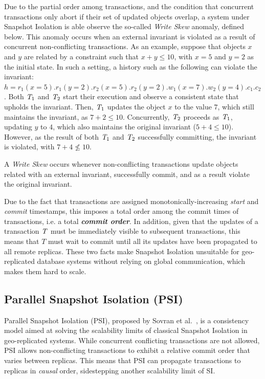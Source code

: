 Due to the partial order among transactions, and the condition that concurrent transactions only abort if their set of updated objects overlap, a system under Snapshot Isolation is able observe the so-called \emph{Write Skew} anomaly, defined below. This anomaly occurs when an external invariant is violated as a result of concurrent non-conflicting transactions. As an example, suppose that objects $x$ and $y$ are related by a constraint such that $x + y \le 10$, with $x = 5$ and $y = 2$ as the initial state. In such a setting, a history such as the following can violate the invariant: $h = r_1(x=5).r_1(y=2).r_2(x=5).r_2(y=2).w_1(x=7).w_2(y=4).c_1.c_2$. Both $\mathit{T}_1$ and $\mathit{T}_2$ start their execution and observe a consistent state that upholds the invariant. Then, $\mathit{T}_1$ updates the object $x$ to the value $7$, which still maintains the invariant, as $7 + 2 \le 10$. Concurrently, $\mathit{T}_2$ proceeds as $\mathit{T}_1$, updating $y$ to $4$, which also maintains the original invariant ($5 + 4 \le 10$). However, as the result of both $\mathit{T}_1$ and $\mathit{T}_2$ successfully committing, the invariant is violated, with $7 + 4 \not\le 10$.

\begin{definition}
A \emph{Write Skew} occurs whenever non-conflicting transactions update objects related with an external invariant, successfully commit, and as a result violate the original invariant.
\end{definition}

Due to the fact that transactions are assigned monotonically-increasing \emph{start} and \emph{commit} timestamps, this imposes a total order among the commit times of transactions, i.e. a total \textbf{\em commit order}. In addition, given that the updates of a transaction $\mathit{T}$ must be immediately visible to subsequent transactions, this means that $T$ must wait to commit until all its updates have been propagated to all remote replicas. These two facts make Snapshot Isolation unsuitable for geo-replicated database systems without relying on global communication, which makes them hard to scale.

\subsection{Parallel Snapshot Isolation (PSI)}
\label{sect:psi}

Parallel Snapshot Isolation (PSI), proposed by Sovran et al.~\citep{psi-intro}, is a consistency model aimed at solving the scalability limits of classical Snapshot Isolation in geo-replicated systems. While concurrent conflicting transactions are not allowed, PSI allows non-conflicting transactions to exhibit a relative commit order that varies between replicas. This means that PSI can propagate transactions to replicas in \emph{causal} order, sidestepping another scalability limit of SI.

